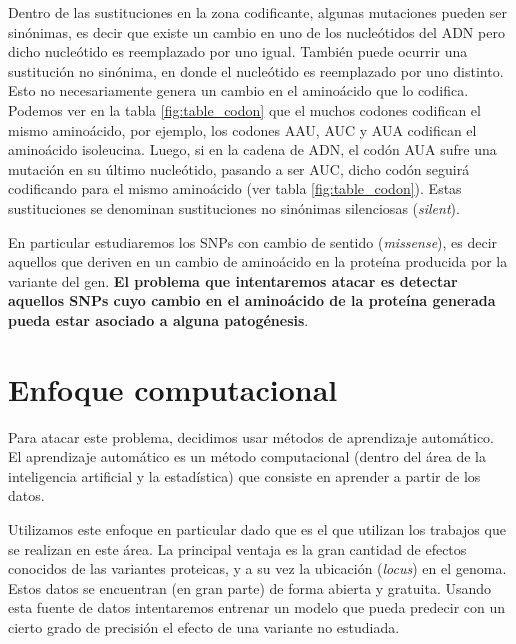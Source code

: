 Dentro de las sustituciones en la zona codificante, algunas mutaciones pueden ser sinónimas, es decir que existe un cambio en uno de los nucleótidos del ADN pero dicho nucleótido es reemplazado por uno igual. También puede ocurrir una sustitución no sinónima, en donde el nucleótido es reemplazado por uno distinto. Esto no necesariamente genera un cambio en el aminoácido que lo codifica. Podemos ver en la tabla \ref{fig:table_codon} que el muchos codones codifican el mismo aminoácido, por ejemplo, los codones AAU, AUC y AUA codifican el aminoácido isoleucina. Luego, si en la cadena de ADN, el codón AUA sufre una mutación en su último nucleótido, pasando a ser AUC, dicho codón seguirá codificando para el mismo aminoácido (ver tabla \ref{fig:table_codon}). Estas sustituciones se denominan sustituciones no sinónimas silenciosas (\textit{silent}).

En particular estudiaremos los SNPs con cambio de sentido (\textit{missense}), es decir aquellos que deriven en un cambio de aminoácido en la proteína producida por la variante del gen. \textbf{El problema que intentaremos atacar es detectar aquellos SNPs cuyo cambio en el aminoácido de la proteína generada pueda estar asociado a alguna patogénesis}. 




\section{Enfoque computacional}

Para atacar este problema, decidimos usar métodos de aprendizaje automático. El aprendizaje automático es un método computacional (dentro del área de la inteligencia artificial y la estadística) que consiste en aprender a partir de los datos. 

Utilizamos este enfoque en particular dado que es el que utilizan los trabajos que se realizan en este área. La principal ventaja es la gran cantidad de efectos conocidos de las variantes proteicas, y a su vez la ubicación (\textit{locus}) en el genoma. Estos datos se encuentran (en gran parte) de forma abierta y gratuita. Usando esta fuente de datos intentaremos entrenar un modelo que pueda predecir con un cierto grado de precisión el efecto de una variante no estudiada. 

